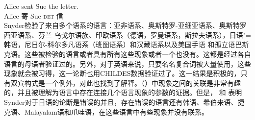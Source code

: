 \ex 
\gll Alice sent Sue the letter.\\ 
    Alice 寄 Sue \textsc{det} 信\\           
\zl 
Snyder检验了来自多个语系的语言：亚非语系、奥斯特罗-亚细亚语系、奥斯特罗西亚语系、芬兰-乌戈尔语族、印欧语系（德语，罗曼语系，斯拉夫语系），日语"=韩语，尼日尔-科尔多凡语系（班图语系）和汉藏语系以及美国手语 和孤立语巴斯克语。这些被检验的语言或者具有所有这些现象或者一个也没有。这都是经过各自语言的母语者验证过的。另外，对于英语来说，只要名名复合词被大量使用，这些现象就会被习得，这一论断也用CHILDES数据验证过了。这一结果是积极的，只有双宾构式是一个例外，对此也找到了解释。（）中现象之间的关联是非常有趣的，并且被理解为语言中存在连接几个语言现象的参数的证据。但是， \citet{Son2007a}和 \citet{SonS2008a}表明Synder对于日语的论断是错误的并且，存在错误的语言还有韩语、希伯来语、捷克语、Malayalam语和爪哇语，在这些语言中有些现象并没有联系。

